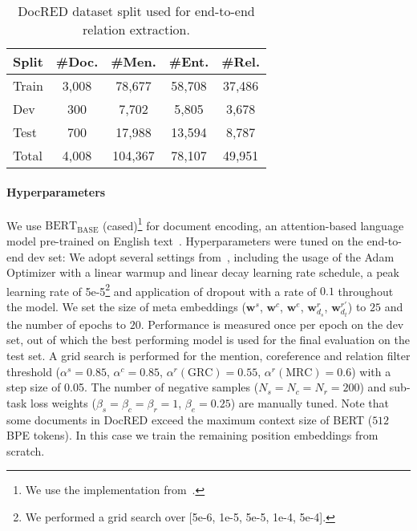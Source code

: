 \documentclass[11pt,a4paper]{article}
\begin{document}
\begin{table}
\centering
\begin{tabular}{l c c c c }
\toprule
    \textbf{Split} & {\#Doc.} & {\#Men.} & {\#Ent.} & {\#Rel.} \\ \midrule
     Train & 3,008 & 78,677 & 58,708 & 37,486 \\
     Dev & 300 & 7,702 & 5,805 & 3,678 \\
     Test & 700 & 17,988 & 13,594 & 8,787 \\
     Total & 4,008 & 104,367 & 78,107 & 49,951 \\
     \bottomrule
\end{tabular}
\caption{DocRED dataset split used for end-to-end relation extraction.} 
\label{table:joint_split} 
\end{table}

\paragraph{Hyperparameters} We use $\text{BERT}_{\text{BASE}}$ (cased)\footnote{We use the implementation from~\cite{wolf:2019:hugging_face}.} for document encoding, an attention-based language model pre-trained on English text~\cite{devlin:2018:bert}. Hyperparameters were tuned on the end-to-end dev set: We adopt several settings from~\cite{devlin:2018:bert}, including the usage of the Adam Optimizer with a linear warmup and linear decay learning rate schedule, a peak learning rate of 5e-5\footnote{We performed a grid search over [5e-6, 1e-5, 5e-5, 1e-4, 5e-4].} and application of dropout with a rate of $0.1$ throughout the model. We set the size of meta embeddings ($\mathbf{w}^s$, $\mathbf{w}^c$, $\mathbf{w}^e$, $\mathbf{w}_{d_s}^r$, $\mathbf{w}_{d_t}^{r'}$) to $25$ and the number of epochs to $20$. Performance is measured once per epoch on the dev set, out of which the best performing model is used for the final evaluation on the test set. A grid search is performed for the mention, coreference and relation filter threshold ($\alpha^s{=}0.85$, $\alpha^c{=}0.85$, $\alpha^r (\text{GRC}){=}0.55$, $\alpha^r (\text{MRC}){=}0.6$) with a step size of 0.05. The number of negative samples ($N_s{=}N_c{=}N_r{=}200$) and sub-task loss weights ($\beta_s{=}\beta_c{=}\beta_r{=}1$, $\beta_e{=}0.25$) are manually tuned. Note that some documents in DocRED exceed the maximum context size of BERT ($512$ BPE tokens). In this case we train the remaining position embeddings from scratch.
\end{document}
